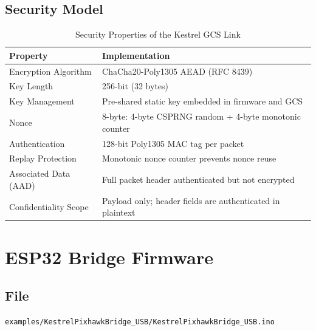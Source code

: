 \documentclass[11pt,a4paper]{article}
\begin{document}
\subsection{Security Model}

\begin{table}[H]
    \centering
    \begin{tabularx}{\textwidth}{@{}lX@{}}
        \toprule
        \textbf{Property}       & \textbf{Implementation} \\
        \midrule
        Encryption Algorithm    & ChaCha20-Poly1305 AEAD (RFC 8439) \\
        Key Length              & 256-bit (32 bytes) \\
        Key Management          & Pre-shared static key embedded in firmware and GCS \\
        Nonce                   & 8-byte: 4-byte CSPRNG random + 4-byte monotonic counter \\
        Authentication          & 128-bit Poly1305 MAC tag per packet \\
        Replay Protection       & Monotonic nonce counter prevents nonce reuse \\
        Associated Data (AAD)   & Full packet header authenticated but not encrypted \\
        Confidentiality Scope   & Payload only; header fields are authenticated in plaintext \\
        \bottomrule
    \end{tabularx}
    \caption{Security Properties of the Kestrel GCS Link}
\end{table}

\newpage

\section{ESP32 Bridge Firmware}
\label{sec:firmware}

\subsection{File}
\begin{center}
    \texttt{examples/KestrelPixhawkBridge\_USB/KestrelPixhawkBridge\_USB.ino}
\end{center}
\end{document}
